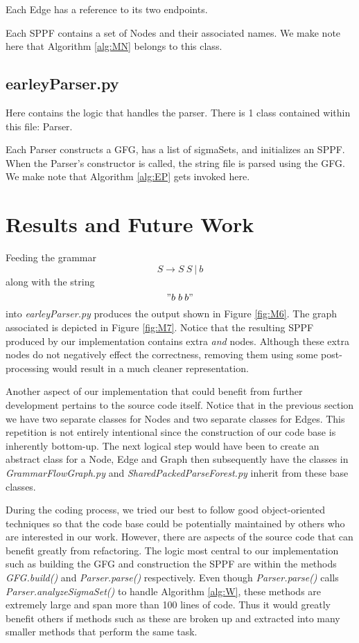 \documentclass{sigplanconf}
\begin{document}
Each Edge has a reference to its two endpoints. 

Each SPPF contains a set of Nodes and their associated names. We make note here that Algorithm \ref{alg:MN} belongs to this class.

\subsection{earleyParser.py}

Here contains the logic that handles the parser. There is 1 class contained within this file: Parser.

Each Parser constructs a GFG, has a list of sigmaSets, and initializes an SPPF. When the Parser's constructor is called, the string file is parsed using the GFG. We make note that Algorithm \ref{alg:EP} gets invoked here.

\section{Results and Future Work}

Feeding the grammar $$S\longrightarrow{S\:{S\:{|\:{b}}}}$$ along with the string $$"b\;{b\:{b}}"$$ into \textit{earleyParser.py} produces the output shown in Figure \ref{fig:M6}. The graph associated is depicted in Figure \ref{fig:M7}. Notice that the resulting SPPF produced by our implementation contains extra \textit{and} nodes. Although these extra nodes do not negatively effect the correctness, removing them using some post-processing would result in a much cleaner representation.

Another aspect of our implementation that could benefit from further development pertains to the source code itself. Notice that in the previous section we have two separate classes for Nodes and two separate classes for Edges. This repetition is not entirely intentional since the construction of our code base is inherently bottom-up. The next logical step would have been to create an abstract class for a Node, Edge and Graph then subsequently have the classes in \textit{GrammarFlowGraph.py} and \textit{SharedPackedParseForest.py} inherit from these base classes.

During the coding process, we tried our best to follow good object-oriented techniques so that the code base could be potentially maintained by others who are interested in our work. However, there are aspects of the source code that can benefit greatly from refactoring. The logic most central to our implementation such as building the GFG and construction the SPPF are within the methods \textit{GFG.build()} and \textit{Parser.parse()} respectively. Even though \textit{Parser.parse()} calls \textit{Parser.analyzeSigmaSet()} to handle Algorithm \ref{alg:W}, these methods are extremely large and span more than 100 lines of code. Thus it would greatly benefit others if methods such as these are broken up and extracted into many smaller methods that perform the same task.
\end{document}
